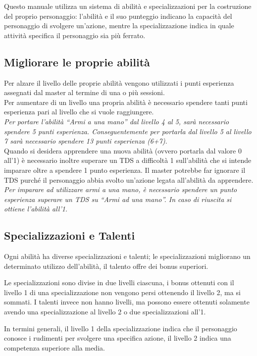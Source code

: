 \documentclass[../manuale_main.tex]{subfiles}
\begin{document}
Questo manuale utilizza un sistema di abilità e specializzazioni per la costruzione del proprio personaggio: l'abilità e il suo punteggio indicano la capacità del personaggio di svolgere un'azione, mentre la specializzazione indica in quale attività specifica il personaggio sia più ferrato.

\subsection{Migliorare le proprie abilità}
Per alzare il livello delle proprie abilità vengono utilizzati i punti esperienza assegnati dal master al termine di una o più sessioni.\\
Per aumentare di un livello una propria abilità è necessario spendere tanti punti esperienza pari al livello che si vuole raggiungere.\\
\emph{Per portare l'abilità ``Armi a una mano” dal livello 4 al 5, sarà necessario spendere 5 punti esperienza. Conseguentemente per portarla dal livello 5 al livello 7 sarà necessario spendere 13 punti esperienza (6+7).}\\
Quando si desidera apprendere una nuova abilità (ovvero portarla dal valore 0 all'1) è necessario inoltre superare un TDS a difficoltà 1 sull'abilità che si intende imparare oltre a spendere 1 punto esperienza. Il master potrebbe far ignorare il TDS purché il personaggio abbia svolto un'azione legata all'abilità da apprendere.\\
\emph{Per imparare ad utilizzare armi a una mano, è necessario spendere un punto esperienza superare un TDS su ``Armi ad una mano”.  In caso di riuscita si ottiene l'abilità all'1.}

\subsection{Specializzazioni e Talenti}
Ogni abilità ha diverse specializzazioni e talenti; le specializzazioni migliorano un determinato utilizzo dell'abilità, il talento offre dei bonus superiori.

Le specializzazioni sono divise in due livelli ciascuna, i bonus ottenuti con il livello 1 di una specializzazione non vengono persi ottenendo il livello 2, ma si sommati.
I talenti invece non hanno livelli, ma possono essere ottenuti solamente avendo una specializzazione al livello 2 o due specializzazioni all'1.

In termini generali, il livello 1 della specializzazione indica che il personaggio conosce i rudimenti per svolgere una specifica azione, il livello 2 indica una competenza superiore alla media.
\end{document}
